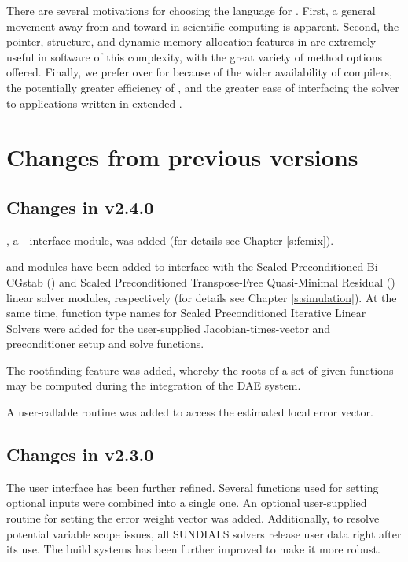 There are several motivations for choosing the {\C} language for {\ida}.
First, a general movement away from {\F} and toward {\C} in scientific
computing is apparent.  Second, the pointer, structure, and dynamic
memory allocation features in {\C} are extremely useful in software of
this complexity, with the great variety of method options offered.
Finally, we prefer {\C} over {\CPP} for {\ida} because of the wider
availability of {\C} compilers, the potentially greater efficiency of {\C},
and the greater ease of interfacing the solver to applications written
in extended {\F}.

\section{Changes from previous versions}

\subsection*{Changes in v2.4.0}

{\fida}, a {\F}-{\C} interface module, was added (for details see Chapter
\ref{s:fcmix}).

{\idaspbcg} and {\idasptfqmr} modules have been added to interface with the
Scaled Preconditioned Bi-CGstab ({\spbcg}) and Scaled Preconditioned
Transpose-Free Quasi-Minimal Residual ({\sptfqmr}) linear solver modules,
respectively (for details see Chapter \ref{s:simulation}).
At the same time, function type names for Scaled Preconditioned Iterative
Linear Solvers were added for the user-supplied Jacobian-times-vector and
preconditioner setup and solve functions.

The rootfinding feature was added, whereby the roots of a set of given
functions may be computed during the integration of the DAE system.

A user-callable routine was added to access the estimated local error
vector.

\subsection*{Changes in v2.3.0}

The user interface has been further refined. Several functions used
for setting optional inputs were combined into a single one.
An optional user-supplied routine for setting the error weight
vector was added.
Additionally, to resolve potential variable scope issues, all
SUNDIALS solvers release user data right after its use. The build
systems has been further improved to make it more robust.

